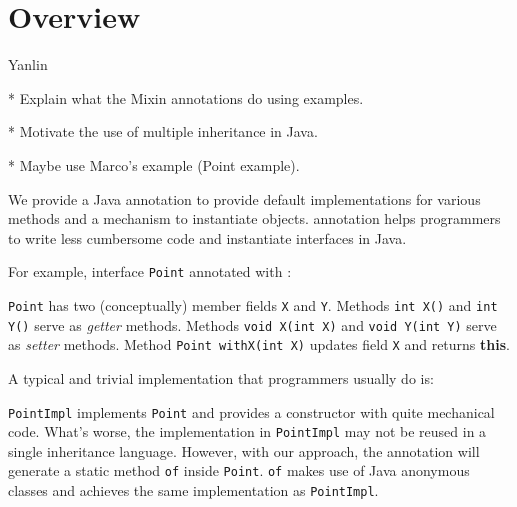 \section{Overview}\label{sec:ep}
Yanlin

* Explain what the Mixin annotations do using examples.

* Motivate the use of multiple inheritance in Java.

* Maybe use Marco's example (Point example).

We provide a Java annotation \mixin to provide default implementations for
various methods and a mechanism to instantiate objects. \mixin annotation helps
programmers to write less cumbersome code and instantiate interfaces in Java.

For example, interface \texttt{Point} annotated with \mixin:


\texttt{Point} has two (conceptually) member fields \texttt{X} and
\texttt{Y}. Methods \texttt{int X()} and \texttt{int Y()} serve as \emph{getter}
methods. Methods \texttt{void X(int X)} and \texttt{void Y(int Y)} serve as
\emph{setter} methods. Method \texttt{Point withX(int X)} updates field
\texttt{X} and returns \textbf{this}.

A typical and trivial implementation that programmers usually do is:


\texttt{PointImpl} implements \texttt{Point} and provides a constructor with
quite mechanical code. What's worse, the implementation in \texttt{PointImpl}
may not be reused in a single inheritance language. However, with our approach,
the \mixin annotation will generate a static method \texttt{of} inside
\texttt{Point}. \texttt{of} makes use of Java anonymous classes and achieves the
same implementation as \texttt{PointImpl}.


